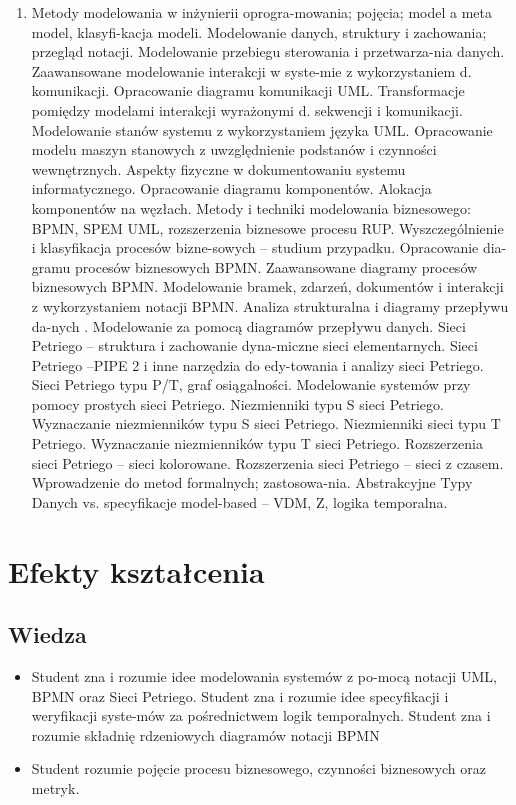 \documentclass[12pt, a4paper]{article}
\begin{document}
\begin{enumerate}
  \item Metody modelowania w inżynierii oprogra-mowania; pojęcia; model a meta model, klasyfi-kacja modeli. Modelowanie danych, struktury i zachowania; przegląd notacji. Modelowanie przebiegu sterowania i przetwarza-nia danych. Zaawansowane modelowanie interakcji w syste-mie z wykorzystaniem d. komunikacji. Opracowanie diagramu komunikacji UML. Transformacje pomiędzy modelami interakcji wyrażonymi d. sekwencji i komunikacji. Modelowanie stanów systemu z wykorzystaniem języka UML. Opracowanie modelu maszyn stanowych z uwzględnienie podstanów i czynności wewnętrznych. Aspekty fizyczne w dokumentowaniu systemu informatycznego. Opracowanie diagramu komponentów. Alokacja komponentów na węzłach. Metody i techniki modelowania biznesowego: BPMN, SPEM UML, rozszerzenia biznesowe procesu RUP. Wyszczególnienie i klasyfikacja procesów bizne-sowych – studium przypadku. Opracowanie dia-gramu procesów biznesowych BPMN. Zaawansowane diagramy procesów biznesowych BPMN. Modelowanie bramek, zdarzeń, dokumentów i interakcji z wykorzystaniem notacji BPMN. Analiza strukturalna i diagramy przepływu da-nych . Modelowanie za pomocą diagramów przepływu danych. Sieci Petriego – struktura i zachowanie dyna-miczne sieci elementarnych. Sieci Petriego –PIPE 2 i inne narzędzia do edy-towania i analizy sieci Petriego. Sieci Petriego typu P/T, graf osiągalności. Modelowanie systemów przy pomocy prostych sieci Petriego. Niezmienniki typu S sieci Petriego. Wyznaczanie niezmienników typu S sieci Petriego. Niezmienniki sieci typu T Petriego. Wyznaczanie niezmienników typu T sieci Petriego. Rozszerzenia sieci Petriego – sieci kolorowane. Rozszerzenia sieci Petriego – sieci z czasem. Wprowadzenie do metod formalnych; zastosowa-nia. Abstrakcyjne Typy Danych vs. specyfikacje model-based – VDM, Z, logika temporalna.
\end{enumerate}

\section{Efekty kształcenia}

\subsection*{Wiedza}
\begin{itemize}
  \item Student zna i rozumie idee modelowania systemów z po-mocą notacji UML, BPMN oraz Sieci Petriego. Student zna i rozumie idee specyfikacji i weryfikacji syste-mów za pośrednictwem logik temporalnych. Student zna i rozumie składnię rdzeniowych diagramów notacji BPMN
  \item Student rozumie pojęcie procesu biznesowego, czynności biznesowych oraz metryk.
\end{itemize}
\end{document}
